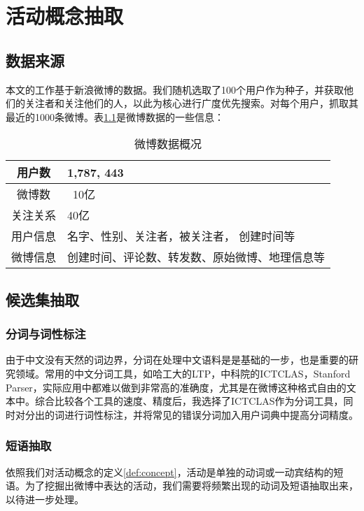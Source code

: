 
\chapter{活动概念抽取}
\label{chp:concept}
\section{数据来源}
本文的工作基于新浪微博的数据。我们随机选取了100个用户作为种子，并获取他们的关注者和关注他们的人，以此为核心进行广度优先搜索。对每个用户，抓取其最近的1000条微博。表\ref{table:weibo_stat}是微博数据的一些信息：
\begin{table}[!h]
\centering
\begin{tabular}{|c|p{4cm}|}
\hline
用户数 & 1,787, 443 \\
\hline
微博数 & ~10亿 \\
\hline 
关注关系 & 40亿 \\
\hline 
用户信息 & 名字、性别、关注者，被关注者， 创建时间等 \\
\hline
微博信息 & 创建时间、评论数、转发数、原始微博、地理信息等 \\
\hline
\end{tabular}
\caption{微博数据概况}
\label{table:weibo_stat}
\end{table}

\section{候选集抽取}
\subsection{分词与词性标注}

由于中文没有天然的词边界，分词在处理中文语料是是基础的一步，也是重要的研究领域。常用的中文分词工具，如哈工大的LTP，中科院的ICTCLAS，Stanford Parser，实际应用中都难以做到非常高的准确度，尤其是在微博这种格式自由的文本中。综合比较各个工具的速度、精度后，我选择了ICTCLAS作为分词工具，同时对分出的词进行词性标注，并将常见的错误分词加入用户词典中提高分词精度。

\subsection{短语抽取}
依照我们对活动概念的定义\ref{def:concept}，活动是单独的动词或一动宾结构的短语。为了挖掘出微博中表达的活动，我们需要将频繁出现的动词及短语抽取出来，以待进一步处理。

